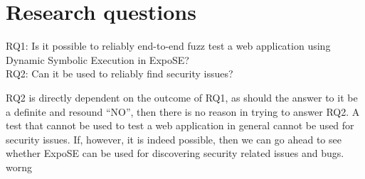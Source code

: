 \section{Research questions}
\label{sec:research-questions}


RQ1: Is it possible to reliably end-to-end fuzz test a web application using Dynamic Symbolic Execution in ExpoSE?\\
RQ2: Can it be used to reliably find security issues?

RQ2 is directly dependent on the outcome of RQ1, as should the answer to it be a definite and resound “NO”, then there is no reason in trying to answer RQ2. A test that cannot be used to test a web application in general cannot be used for security issues. If, however, it is indeed possible, then we can go ahead to see whether ExpoSE can be used for discovering security related issues and bugs. worng
